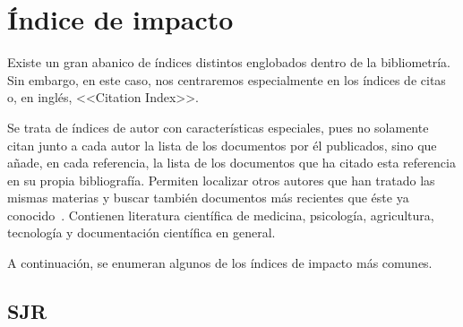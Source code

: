  
\section{Índice de impacto}

Existe un gran abanico de índices distintos englobados dentro de la bibliometría. Sin embargo, en este caso, nos centraremos especialmente en los índices de citas o, en inglés, <<Citation Index>>.

Se trata de índices de autor con características especiales, pues no solamente citan junto a cada autor la lista de los documentos por él publicados, sino que añade, en cada referencia, la lista de los documentos que ha citado esta referencia en su propia bibliografía. Permiten localizar otros autores que han tratado las mismas materias y buscar también documentos más recientes que éste ya conocido~\cite{Amat1989}. Contienen literatura científica de medicina, psicología, agricultura, tecnología y documentación científica en general. 

A continuación, se enumeran algunos de los índices de impacto más comunes.









\subsection{SJR}

